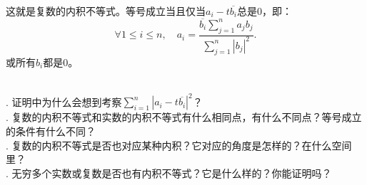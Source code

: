 \documentclass[12pt,UTF8]{ctexbook}
\begin{document}
\begin{appendix}
这就是复数的内积不等式。等号成立当且仅当$a_i - t\overline{b_i}$总是$0$，即：
$$ \forall 1\leqslant i \leqslant n, \quad a_i = \frac{\overline{b_i} \displaystyle \sum_{j=1}^n a_jb_j}{\displaystyle \sum_{j=1}^n |b_j|^2} . $$
或所有$b_i$都是$0$。

\begin{sk}
    \mbox{} \\
    . 证明中为什么会想到考察$\displaystyle \sum_{i=1}^n |a_i - t\overline{b_i}|^2$？\\
    . 复数的内积不等式和实数的内积不等式有什么相同点，有什么不同点？等号成立的条件有什么不同？\\
    . 复数的内积不等式是否也对应某种内积？它对应的角度是怎样的？在什么空间里？\\
    . 无穷多个实数或复数是否也有内积不等式？它是什么样的？你能证明吗？
\end{sk}

\end{appendix}
\end{document}
